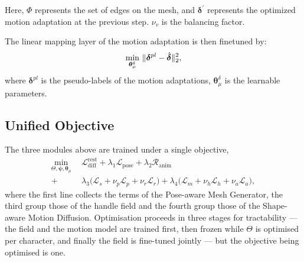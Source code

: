 \documentclass[lettersize,journal]{IEEEtran}
\begin{document}
Here, $\Phi$ represents the set of edges on the mesh, and $\bm{\delta}^{'}$ represents the optimized motion adaptation at the previous step. $\nu_{v}$ is the balancing factor.

The linear mapping layer of the motion adaptation is then finetuned by:
\begin{equation} \label{Eq.14}
\setlength{\belowdisplayskip}{-1pt}
\min_{\bm{\theta}_{\mu}^{\delta}}~\lVert \bm{\delta}^{pl} - \hat{\bm{\delta}} \rVert^{2}_{2},
\end{equation}
where $\bm{\delta}^{pl}$ is the pseudo-labels of the motion adaptations, $\bm{\theta}_{\mu}^{\delta}$ is the learnable parameters.


\subsection{Unified Objective} \label{sec:unified}
The three modules above are trained under a single objective,
\begin{equation} \label{Eq.unified}
\begin{aligned}
\min_{\Theta,\bm{\psi},\bm{\theta}_{\mu}}\ \
& \mathcal{L}^{\text{rest}}_{\text{diff}}
+\lambda_{1}\mathcal{L}_{\text{pose}}
+\lambda_{2}\mathcal{R}_{\text{anim}} \\
+\ & \lambda_{3}\big(\mathcal{L}_{s}+\nu_{p}\mathcal{L}_{p}+\nu_{r}\mathcal{L}_{r}\big)
+\lambda_{4}\big(\mathcal{L}_{m}+\nu_{h}\mathcal{L}_{h}+\nu_{a}\mathcal{L}_{a}\big),
\end{aligned}
\end{equation}
where the first line collects the terms of the Pose-aware Mesh Generator, the third group
those of the handle field and the fourth group those of the Shape-aware Motion Diffusion.
Optimisation proceeds in three stages for tractability --- the field and the motion model are
trained first, then frozen while $\Theta$ is optimised per character, and finally the field is
fine-tuned jointly --- but the objective being optimised is one.
\end{document}
